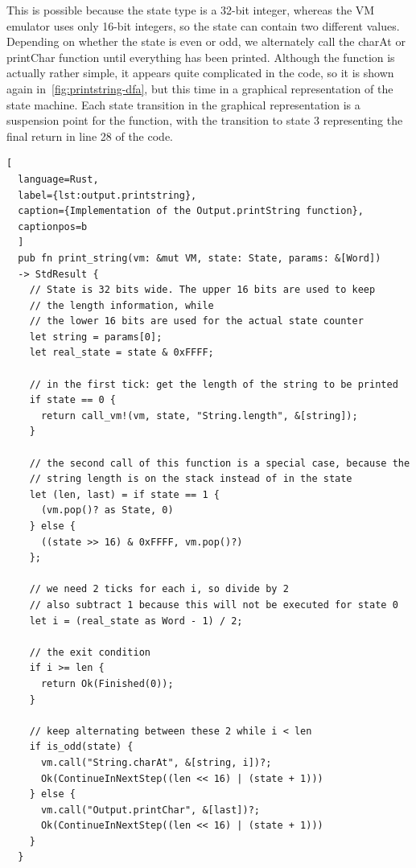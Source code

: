 This is possible because the state type is a 32-bit integer, whereas the VM emulator uses only 16-bit integers, so the state can contain two different values.
Depending on whether the state is even or odd, we alternately call the charAt or printChar function until everything has been printed.
Although the function is actually rather simple, it appears quite complicated in the code, so it is shown again in~\cref{fig:printstring-dfa}, but this time in a graphical representation of the state machine.
Each state transition in the graphical representation is a suspension point for the function, with the transition to state \(3\) representing the final return in line 28 of the code.

\begin{lstlisting}[
  language=Rust,
  label={lst:output.printstring},
  caption={Implementation of the Output.printString function},
  captionpos=b
  ]
  pub fn print_string(vm: &mut VM, state: State, params: &[Word])
  -> StdResult {
    // State is 32 bits wide. The upper 16 bits are used to keep
    // the length information, while
    // the lower 16 bits are used for the actual state counter
    let string = params[0];
    let real_state = state & 0xFFFF;

    // in the first tick: get the length of the string to be printed
    if state == 0 {
      return call_vm!(vm, state, "String.length", &[string]);
    }

    // the second call of this function is a special case, because the
    // string length is on the stack instead of in the state
    let (len, last) = if state == 1 {
      (vm.pop()? as State, 0)
    } else {
      ((state >> 16) & 0xFFFF, vm.pop()?)
    };

    // we need 2 ticks for each i, so divide by 2
    // also subtract 1 because this will not be executed for state 0
    let i = (real_state as Word - 1) / 2;

    // the exit condition
    if i >= len {
      return Ok(Finished(0));
    }

    // keep alternating between these 2 while i < len
    if is_odd(state) {
      vm.call("String.charAt", &[string, i])?;
      Ok(ContinueInNextStep((len << 16) | (state + 1)))
    } else {
      vm.call("Output.printChar", &[last])?;
      Ok(ContinueInNextStep((len << 16) | (state + 1)))
    }
  }
\end{lstlisting}

